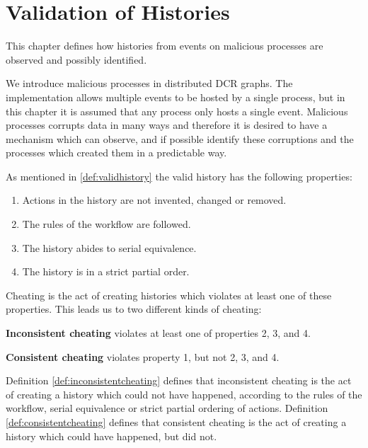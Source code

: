 \chapter{Validation of Histories}\label{chap:validation}
	This chapter defines how histories from events on malicious processes are observed and possibly identified.
	
	\newpar We introduce malicious processes in distributed DCR graphs. The implementation allows multiple events to be hosted by a single process, but in this chapter it is assumed that any process only hosts a single event. Malicious processes corrupts data in many ways and therefore it is desired to have a mechanism which can observe, and if possible identify these corruptions and the processes which created them in a predictable way. 
    
    \newpar As mentioned in \autoref{def:validhistory} the valid history has the following properties:
    
    \begin{enumerate}
    	\item Actions in the history are not invented, changed or removed.
    	\item The rules of the workflow are followed.
    	\item The history abides to serial equivalence.
    	\item The history is in a strict partial order.
    \end{enumerate}
	
	\noindent Cheating is the act of creating histories which violates at least one of these properties. This leads us to two different kinds of cheating:
	
	\begin{definition}
		\textbf{Inconsistent cheating} violates at least one of properties 2, 3, and 4.
		\label{def:inconsistentcheating}
	\end{definition}
	
	\begin{definition}
		\textbf{Consistent cheating} violates property 1, but not 2, 3, and 4.
		\label{def:consistentcheating}
	\end{definition}
	
	\noindent Definition \ref{def:inconsistentcheating} defines that inconsistent cheating is the act of creating a history which could not have happened, according to the rules of the workflow, serial equivalence or strict partial ordering of actions. Definition \ref{def:consistentcheating} defines that consistent cheating is the act of creating a history which could have happened, but did not.
	
